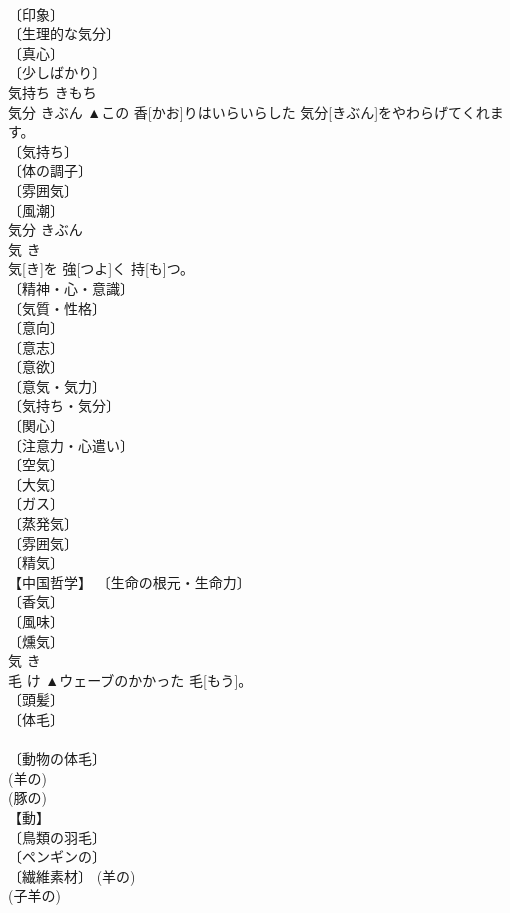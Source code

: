 \documentclass[8pt]{extreport}
\begin{document}
\begin{CJK}{UTF8}{min}
\\	〔印象〕 
\\	〔生理的な気分〕 
\\	〔真心〕 
\\	〔少しばかり〕 
\\	気持ち	きもち	
\\	気分	きぶん	▲この 香[かお]りはいらいらした 気分[きぶん]をやわらげてくれます。	
\\	〔気持ち〕 
\\	〔体の調子〕 
\\	〔雰囲気〕 
\\	〔風潮〕 
\\	気分	きぶん	
\\	気	き	
\\	気[き]を 強[つよ]く 持[も]つ。	
\\	〔精神・心・意識〕 
\\	〔気質・性格〕 
\\	〔意向〕 
\\	〔意志〕 
\\	〔意欲〕 
\\	〔意気・気力〕 
\\	〔気持ち・気分〕 
\\	〔関心〕 
\\	〔注意力・心遣い〕 
\\	〔空気〕 
\\	〔大気〕 
\\	〔ガス〕 
\\	〔蒸発気〕 
\\	〔雰囲気〕 
\\	〔精気〕 
\\	【中国哲学】 〔生命の根元・生命力〕 
\\	〔香気〕 
\\	〔風味〕 
\\	〔燻気〕 
\\	気	き	
\\	毛	け	▲ウェーブのかかった 毛[もう]。	
\\	〔頭髪〕 
\\	〔体毛〕 
\\	[⇒かみのけ] 
\\	〔動物の体毛〕 
\\	(羊の) 
\\	(豚の) 
\\	【動】 
\\	〔鳥類の羽毛〕 
\\	〔ペンギンの〕 
\\	〔繊維素材〕 (羊の) 
\\	(子羊の) 

\end{CJK}
\end{document}
